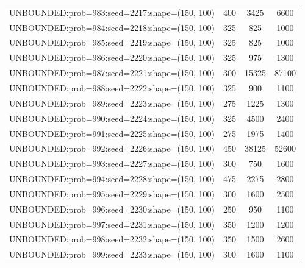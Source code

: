 \begin{longtable}{lccc}
UNBOUNDED:prob=983:seed=2217:shape=(150, 100) &      400 &  3425 &   6600 \\
UNBOUNDED:prob=984:seed=2218:shape=(150, 100) &      325 &   825 &   1000 \\
UNBOUNDED:prob=985:seed=2219:shape=(150, 100) &      325 &   825 &   1000 \\
UNBOUNDED:prob=986:seed=2220:shape=(150, 100) &      325 &   975 &   1300 \\
UNBOUNDED:prob=987:seed=2221:shape=(150, 100) &      300 & 15325 &  87100 \\
UNBOUNDED:prob=988:seed=2222:shape=(150, 100) &      325 &   900 &   1100 \\
UNBOUNDED:prob=989:seed=2223:shape=(150, 100) &      275 &  1225 &   1300 \\
UNBOUNDED:prob=990:seed=2224:shape=(150, 100) &      325 &  4500 &   2400 \\
UNBOUNDED:prob=991:seed=2225:shape=(150, 100) &      275 &  1975 &   1400 \\
UNBOUNDED:prob=992:seed=2226:shape=(150, 100) &      450 & 38125 &  52600 \\
UNBOUNDED:prob=993:seed=2227:shape=(150, 100) &      300 &   750 &   1600 \\
UNBOUNDED:prob=994:seed=2228:shape=(150, 100) &      475 &  2275 &   2800 \\
UNBOUNDED:prob=995:seed=2229:shape=(150, 100) &      300 &  1600 &   2500 \\
UNBOUNDED:prob=996:seed=2230:shape=(150, 100) &      250 &   950 &   1100 \\
UNBOUNDED:prob=997:seed=2231:shape=(150, 100) &      350 &  1200 &   1200 \\
UNBOUNDED:prob=998:seed=2232:shape=(150, 100) &      350 &  1500 &   2600 \\
UNBOUNDED:prob=999:seed=2233:shape=(150, 100) &      300 &  1600 &   1100 \\
\end{longtable}
